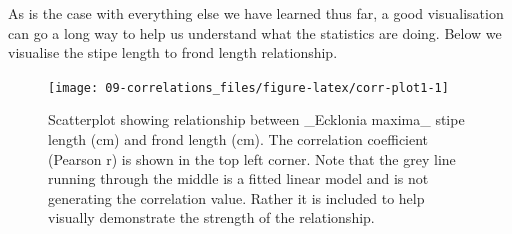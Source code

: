 \documentclass[english,10pt,a4paper,oneside]{book}
\newenvironment{Shaded}{\begin{snugshade}}{\end{snugshade}}
\newcommand{\KeywordTok}[1]{\textcolor[rgb]{0.13,0.29,0.53}{\textbf{#1}}}
\newcommand{\DataTypeTok}[1]{\textcolor[rgb]{0.13,0.29,0.53}{#1}}
\newcommand{\DecValTok}[1]{\textcolor[rgb]{0.00,0.00,0.81}{#1}}
\newcommand{\StringTok}[1]{\textcolor[rgb]{0.31,0.60,0.02}{#1}}
\newcommand{\CommentTok}[1]{\textcolor[rgb]{0.56,0.35,0.01}{\textit{#1}}}
\newcommand{\OperatorTok}[1]{\textcolor[rgb]{0.81,0.36,0.00}{\textbf{#1}}}
\newcommand{\NormalTok}[1]{#1}
\theoremstyle{definition}
\theoremstyle{definition}
\theoremstyle{definition}
\theoremstyle{remark}
\begin{document}
As is the case with everything else we have learned thus far, a good
visualisation can go a long way to help us understand what the
statistics are doing. Below we visualise the stipe length to frond
length relationship.

\begin{Shaded}
\end{Shaded}

\begin{figure}
\texttt{[image: 09-correlations\_files/figure-latex/corr-plot1-1]} \caption{Scatterplot showing relationship between _Ecklonia maxima_ stipe length (cm) and frond length (cm). The correlation coefficient (Pearson r) is shown in the top left corner. Note that the grey line running through the middle is a fitted linear model and is not generating the correlation value. Rather it is included to help visually demonstrate the strength of the relationship.}\label{fig:corr-plot1}
\end{figure}
\end{document}
